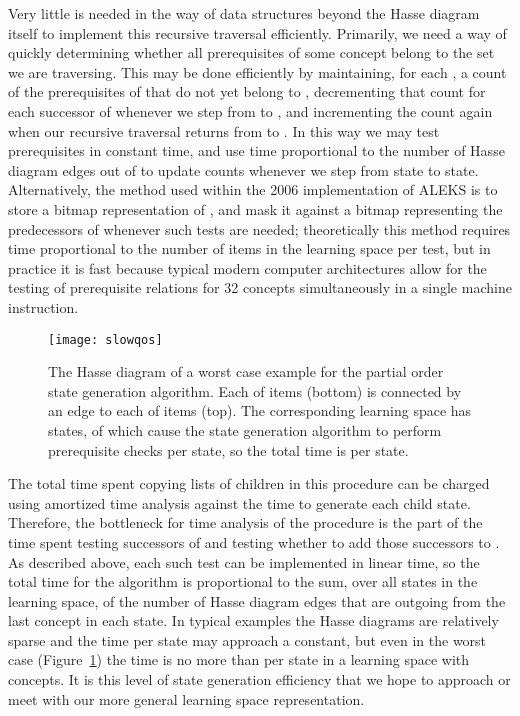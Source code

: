 \documentclass[11pt]{llncs}
\begin{document}
{Very little is needed in the way of data structures beyond the Hasse diagram itself to implement this recursive traversal efficiently. Primarily, we need a way of quickly determining whether all prerequisites of some concept  belong to the set  we are traversing.  This may be done efficiently by maintaining, for each , a count of the prerequisites of  that do not yet belong to , decrementing that count for each successor of  whenever we step from  to , and incrementing the count again when our recursive traversal returns from  to . In this way we may test prerequisites in constant time, and use time proportional to the number of Hasse diagram edges out of  to update counts whenever we step from state to state. Alternatively, the method used within the 2006 implementation of ALEKS is to store a bitmap representation of , and mask it against a bitmap representing the predecessors of  whenever such tests are needed; theoretically this method requires time proportional to the number of items in the learning space per test, but in practice it is fast because typical modern computer architectures allow for the testing of prerequisite relations for 32 concepts simultaneously in a single machine instruction.

\begin{figure}[t]
\centering\texttt{[image: slowqos]}
\caption{The Hasse diagram of a worst case example for the partial order state generation algorithm.
Each of  items (bottom) is connected by an edge to each of  items (top).
The corresponding learning space has  states,  of which cause the state generation algorithm to perform  prerequisite checks per state, so the total time is  per state.}
\label{fig:slowqos}
\end{figure}

The total time spent copying lists of children in this procedure can be charged using amortized time analysis against the time to generate each child state. Therefore, the bottleneck for time analysis of the procedure is the part of the time spent testing successors of  and testing whether to add those successors to . As described above, each such test can be implemented in linear time, so the total time for the algorithm is proportional to the sum, over all states in the learning space, of the number of Hasse diagram edges that are outgoing from the last concept in each state. In typical examples the Hasse diagrams are relatively sparse and the time per state may approach a constant, but even in the worst case (Figure~\ref{fig:slowqos}) the time is no more than  per state in a learning space with  concepts. It is this level of state generation efficiency that we hope to approach or meet with our more general learning space representation.

}
\end{document}
